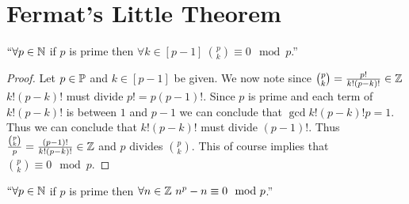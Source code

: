      \section{Fermat's Little Theorem}
        \begin{lemma}
            $``\forall p \in \mathbb{N}$ if $p$ is prime then 
            $\forall k \in [p - 1] \ \binom{p}{k} \equiv 0 \mod p$.''
            \label{prime binomials}
        \end{lemma}
        \begin{proof}
            Let $p \in \mathbb{P}$ and $k \in [p - 1]$ be given. We now note since
            $\binom{p}{k} = \frac{p!}{k!(p - k)!} \in \mathbb{Z}$ $k!(p - k)!$ 
            must divide $p! = p(p - 1)!$. Since $p$ is prime and each term
            of $k!(p - k)!$ is between $1$ and $p - 1$ we can conclude that
            $\gcd{k!(p - k)!}{p} = 1$. Thus we can conclude that $k!(p - k)!$
            must divide $(p - 1)!$. Thus $\frac{\binom{p}{k}}{p} = \frac{(p - 1)!}{k!(p - k)!}
            \in \mathbb{Z}$ and $p$ divides $\binom{p}{k}$. This of course implies that
            $\binom{p}{k} \equiv 0 \mod p$. \QED
        \end{proof}
        \begin{lemma}
            $``\forall p \in \mathbb{N}$ if $p$ is prime then 
            $\forall n \in \mathbb{Z} \ n^p - n \equiv 0 \mod p$.''
            \label{fermat lemma}
        \end{lemma}
